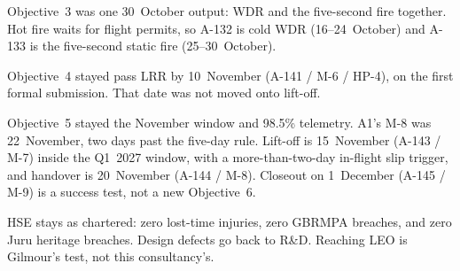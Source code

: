 Objective~3 was one 30~October output: WDR and the five-second fire together. Hot fire waits for flight permits, so A-132 is cold WDR (16--24~October) and A-133 is the five-second static fire (25--30~October).

Objective~4 stayed pass LRR by 10~November (A-141 / M-6 / HP-4), on the first formal submission. That date was not moved onto lift-off.

Objective~5 stayed the November window and 98.5\% telemetry. A1's M-8 was 22~November, two days past the five-day rule. Lift-off is 15~November (A-143 / M-7) inside the Q1~2027 window, with a more-than-two-day in-flight slip trigger, and handover is 20~November (A-144 / M-8). Closeout on 1~December (A-145 / M-9) is a success test, not a new Objective~6.

HSE stays as chartered: zero lost-time injuries, zero GBRMPA breaches, and zero Juru heritage breaches. Design defects go back to R\&D. Reaching LEO is Gilmour's test, not this consultancy's.


